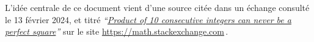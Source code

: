 

L'idée centrale de ce document vient d'une source citée dans un échange consulté le 13 février 2024, et titré
\emph{\enquote{\href{https://math.stackexchange.com/q/2361670/52365}{Product of 10 consecutive integers can never be a perfect square}}} 
sur le site \url{https://math.stackexchange.com}\,.

